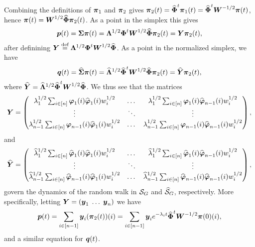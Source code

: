 Combining the  definitions of $\bpi_1$  and $\bpi_2$ gives $\bpi_2(t)  = \Eign^\tp \bpi_1(t) = \Eign^\tp \W^{-1/2}\bpi(t)$, hence 
$\bpi(t) = \W^{1/2} \Eign \bpi_2(t)$. As a point in the  simplex this gives 
\begin{equation*}
\p(t)  = \Sv\bpi(t) = \Eval^{1/2}\Eig^\tp \W^{1/2}\Eign \bpi_2(t) = \Y\bpi_2(t),
\end{equation*}
after definining $\Y\equiv \Eval^{1/2}\Eig^\tp \W^{1/2}\Eign$. As a point in the normalized simplex, we have 
\begin{equation*}
\q(t) = \Svn\bpi(t) = \Evaln^{1/2}\Eign^\tp\W^{1/2}\Eign\bpi_2(t) = \Yn\bpi_2(t),
\end{equation*}
where $\Yn= \Evaln^{1/2}\Eign^\tp\W^{1/2}\Eign$. We thus  see that the matrices 
\begin{equation*}
\Y = \begin{pmatrix}
\lambda_1^{1/2}\sum_{i\in[n]} \vp_1(i)\vpn_1(i) w_i^{1/2} & \dots &  \lambda_1^{1/2}\sum_{i\in[n]} \vp_1(i)\vpn_{n-1}(i) w_i^{1/2} \\
\vdots & \ddots & \vdots \\
\lambda_{n-1}^{1/2}\sum_{i\in[n]} \vp_{n-1}(i)\vpn_1(i) w_i^{1/2} & \dots &  \lambda_{n-1}^{1/2}\sum_{i\in[n]} \vp_{n-1}(i)\vpn_{n-1}(i) w_i^{1/2} 
\end{pmatrix},
\end{equation*}
and  
\begin{equation*}
\Yn  = \begin{pmatrix}
\lambdan_1^{1/2}\sum_{i\in[n]} \vpn_1(i)\vpn_1(i) w_i^{1/2} & \dots &  \lambdan_1^{1/2}\sum_{i\in[n]} \vpn_1(i)\vpn_{n-1}(i) w_i^{1/2} \\
\vdots & \ddots & \vdots \\
\lambdan_{n-1}^{1/2}\sum_{i\in[n]} \vpn_{n-1}(i)\vpn_1(i) w_i^{1/2} & \dots &  \lambdan_{n-1}^{1/2}\sum_{i\in[n]} \vpn_{n-1}(i)\vpn_{n-1}(i) w_i^{1/2} 
\end{pmatrix},
\end{equation*}
govern the dynamics of the random walk in  $\splx_G$ and $\splxn_G$, respectively.  More specifically, letting $\Y=(\y_1\;\dots\;\y_n)$ we have 
\[\p(t) = \sum_{i\in[n-1]} \y_i (\bpi_2(t))(i) = \sum_{i\in[n-1]}  \y_i e^{-\lambda_i t} \Eign^\tp \W^{-1/2}\bpi(0)(i),\]
and a similar  equation for $\q(t)$. 






